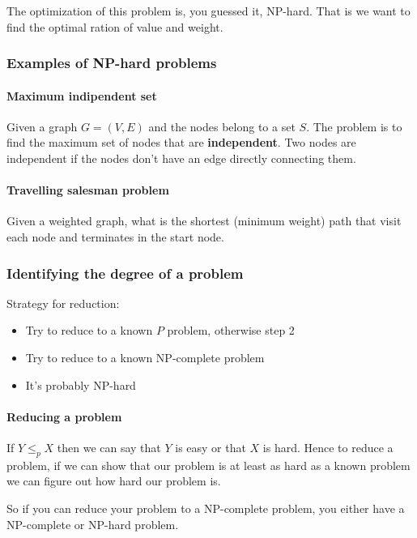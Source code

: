 \documentclass[12pt]{article} %
\begin{document}
\par The optimization of this problem is, you guessed it, NP-hard. That is we want to find the optimal ration of value and weight.

\subsubsection{Examples of NP-hard problems}

\paragraph{Maximum indipendent set}
Given a graph $G = (V, E)$ and the nodes belong to a set $S$. The problem is to find the maximum set of nodes that are \textbf{independent}. Two nodes are independent if the nodes don't have an edge directly connecting them.

\paragraph{Travelling salesman problem}
Given a weighted graph, what is the shortest (minimum weight) path that visit each node and terminates in the start node.

\subsubsection{Identifying the degree of a problem}
Strategy for reduction:
\begin{itemize}
    \item Try to reduce to a known $P$ problem, otherwise step 2
    \item Try to reduce to a known NP-complete problem
    \item It's probably NP-hard
\end{itemize}

\paragraph{Reducing a problem}
If $Y \leq_{p} X$  then we can say that $Y$ is easy or that $X$ is hard. Hence to reduce a problem, if we can show that our problem is at least as hard as a known problem we can figure out how hard our problem is.

\par  So if you can reduce your problem to a NP-complete problem, you either have a NP-complete or NP-hard problem.
\end{document}
